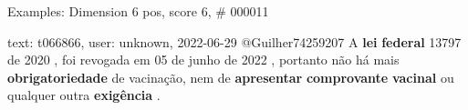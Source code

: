 \begin{frame}{Examples: Dimension 6 pos, score 6, \# 000011}
\footnotesize
\begin{exampleblock}{text: t066866, user: unknown, 2022-06-29}
@Guilher74259207 A \textbf{lei} \textbf{federal} 13797 de 2020 , foi revogada 
em 05 de junho de 2022 , portanto não há mais \textbf{obrigatoriedade} de 
vacinação, nem de \textbf{apresentar} \textbf{comprovante} \textbf{vacinal} ou 
qualquer outra \textbf{exigência} . 
\end{exampleblock}
\end{frame}
